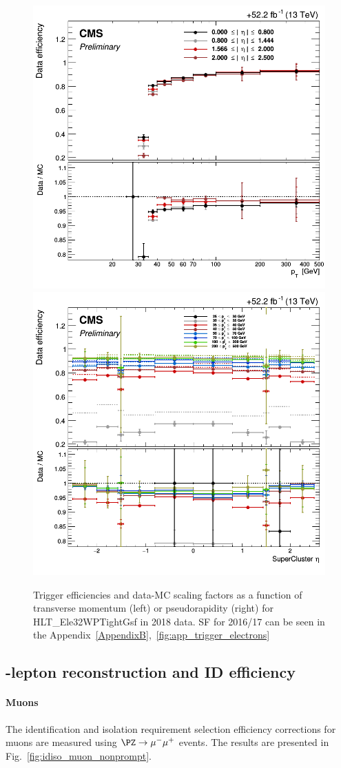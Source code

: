 \begin{figure}[h]
  \centering
  \includegraphics[width=.38\textwidth]{Figures/c6/efficiencies/trigger_electrons/2018/passEle32/leptonSF_SFvspT_passEle32.png}
\hspace{2cm}
  \includegraphics[width=.38\textwidth]{Figures/c6/efficiencies/trigger_electrons/2018/passEle32/leptonSF_SFvseta_passEle32.png}
  \caption{Trigger efficiencies and data-MC scaling factors as a function of transverse momentum (left) or pseudorapidity (right)
    for HLT\_Ele32WPTightGsf in 2018 data. SF for 2016/17 can be seen in the
  Appendix~\ref{AppendixB},~\ref{fig:app_trigger_electrons}
  }
  \label{fig:trigger_electrons}
\end{figure}

\subsection{\Displ-lepton reconstruction and ID efficiency} \label{sec:displeptoneff}
\paragraph{Muons}\label{sec:eff_disp_muon}
The identification and isolation requirement selection
efficiency corrections for \displ muons are measured
using $\PZ\to\mu^-\mu^+$ events. The results are presented
in Fig.~\ref{fig:idiso_muon_nonprompt}. 

